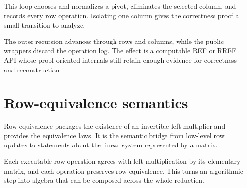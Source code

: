 \begin{definition}
\label{def:elimination-loop}
\leanok
{}
This loop chooses and normalizes a pivot, eliminates the selected column, and records every row
operation.  Isolating one column gives the correctness proof a small transition to analyze.
\end{definition}

\begin{definition}
\label{def:row-reduction-algorithm}
\leanok
{}
The outer recursion advances through rows and columns, while the public wrappers discard the
operation log.  The effect is a computable REF or RREF API whose proof-oriented internals still
retain enough evidence for correctness and reconstruction.
\end{definition}

\chapter{Row-equivalence semantics}

\begin{definition}
\label{def:row-equivalence}
\leanok
Row equivalence packages the existence of an invertible left multiplier and provides the
equivalence laws.  It is the semantic bridge from low-level row updates to statements about
the linear system represented by a matrix.
\end{definition}

\begin{theorem}
\label{thm:elementary-row-semantics}
\leanok
{}
Each executable row operation agrees with left multiplication by its elementary matrix, and
each operation preserves row equivalence.  This turns an algorithmic step into algebra that can
be composed across the whole reduction.
\end{theorem}


